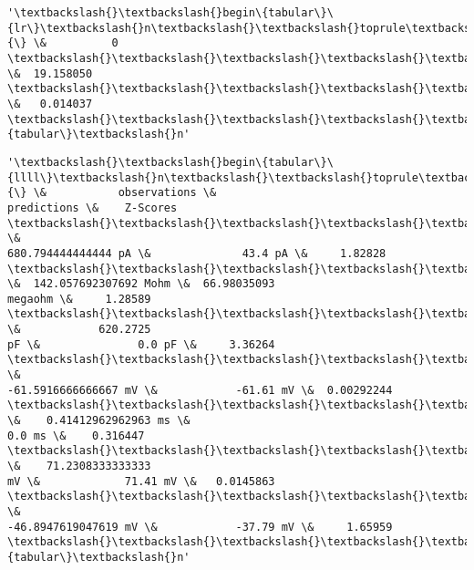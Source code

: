 \documentclass[11pt]{article}
\begin{document}
            \begin{tcolorbox}[breakable, size=fbox, boxrule=.5pt, pad at break*=1mm, opacityfill=0]
\begin{Verbatim}[commandchars=\\\{\}]
'\textbackslash{}\textbackslash{}begin\{tabular\}\{lr\}\textbackslash{}n\textbackslash{}\textbackslash{}toprule\textbackslash{}n\{\} \&          0 \textbackslash{}\textbackslash{}\textbackslash{}\textbackslash{}\textbackslash{}n\textbackslash{}\textbackslash{}midrule\textbackslash{}nchi\textbackslash{}\textbackslash{}\_square
\&  19.158050 \textbackslash{}\textbackslash{}\textbackslash{}\textbackslash{}\textbackslash{}np\textbackslash{}\textbackslash{}\_value    \&   0.014037
\textbackslash{}\textbackslash{}\textbackslash{}\textbackslash{}\textbackslash{}n\textbackslash{}\textbackslash{}bottomrule\textbackslash{}n\textbackslash{}\textbackslash{}end\{tabular\}\textbackslash{}n'
\end{Verbatim}
\end{tcolorbox}
        
            \begin{tcolorbox}[breakable, size=fbox, boxrule=.5pt, pad at break*=1mm, opacityfill=0]
\begin{Verbatim}[commandchars=\\\{\}]
'\textbackslash{}\textbackslash{}begin\{tabular\}\{llll\}\textbackslash{}n\textbackslash{}\textbackslash{}toprule\textbackslash{}n\{\} \&           observations \&
predictions \&    Z-Scores \textbackslash{}\textbackslash{}\textbackslash{}\textbackslash{}\textbackslash{}n\textbackslash{}\textbackslash{}midrule\textbackslash{}nRheobaseTest                   \&
680.794444444444 pA \&              43.4 pA \&     1.82828
\textbackslash{}\textbackslash{}\textbackslash{}\textbackslash{}\textbackslash{}nInputResistanceTest            \&  142.057692307692 Mohm \&  66.98035093
megaohm \&     1.28589 \textbackslash{}\textbackslash{}\textbackslash{}\textbackslash{}\textbackslash{}nCapacitanceTest                \&            620.2725
pF \&               0.0 pF \&     3.36264 \textbackslash{}\textbackslash{}\textbackslash{}\textbackslash{}\textbackslash{}nRestingPotentialTest           \&
-61.5916666666667 mV \&            -61.61 mV \&  0.00292244
\textbackslash{}\textbackslash{}\textbackslash{}\textbackslash{}\textbackslash{}nInjectedCurrentAPWidthTest     \&    0.41412962962963 ms \&
0.0 ms \&    0.316447 \textbackslash{}\textbackslash{}\textbackslash{}\textbackslash{}\textbackslash{}nInjectedCurrentAPAmplitudeTest \&    71.2308333333333
mV \&             71.41 mV \&   0.0145863 \textbackslash{}\textbackslash{}\textbackslash{}\textbackslash{}\textbackslash{}nInjectedCurrentAPThresholdTest \&
-46.8947619047619 mV \&            -37.79 mV \&     1.65959
\textbackslash{}\textbackslash{}\textbackslash{}\textbackslash{}\textbackslash{}n\textbackslash{}\textbackslash{}bottomrule\textbackslash{}n\textbackslash{}\textbackslash{}end\{tabular\}\textbackslash{}n'
\end{Verbatim}
\end{tcolorbox}
        
\end{document}
